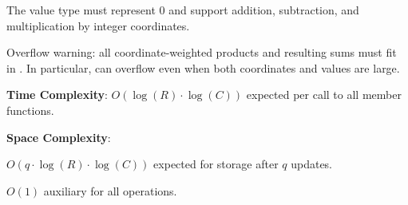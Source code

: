 The value type  must represent $0$ and support addition, subtraction, and multiplication by integer coordinates.

Overflow warning: all coordinate-weighted products and resulting sums must fit in . In particular,  can overflow even  when both coordinates and values are large.

\textbf{Time Complexity}: $O(\log\left(R\right) \cdot \log\left(C\right))$ expected per call to all member functions.

\textbf{Space Complexity}:
\begin{compactitem}
  \item $O(q \cdot \log\left(R\right) \cdot \log\left(C\right))$ expected for storage after $q$ updates.
  \item $O(1)$ auxiliary for all operations.
\end{compactitem}

